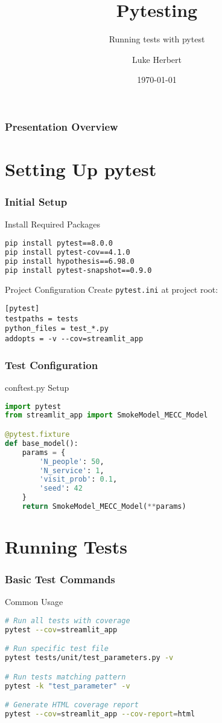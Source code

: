 \documentclass{beamer}
\title{Pytesting}
\subtitle{Running tests with pytest}
\author{Luke Herbert}
\date{\today}
\begin{document}
\frame{\titlepage}

\begin{frame}
    \frametitle{Presentation Overview}
    \tableofcontents
\end{frame}

\section{Setting Up pytest}
\begin{frame}[fragile]
    \frametitle{Initial Setup}
    \begin{block}{Install Required Packages}
        \begin{lstlisting}[language=bash]
pip install pytest==8.0.0
pip install pytest-cov==4.1.0
pip install hypothesis==6.98.0
pip install pytest-snapshot==0.9.0
        \end{lstlisting}
    \end{block}
    
    \begin{alertblock}{Project Configuration}
        Create \texttt{pytest.ini} at project root:
        \begin{lstlisting}[style=configstyle]
[pytest]
testpaths = tests
python_files = test_*.py
addopts = -v --cov=streamlit_app
        \end{lstlisting}
    \end{alertblock}
\end{frame}

\begin{frame}[fragile]
    \frametitle{Test Configuration}
    \begin{block}{conftest.py Setup}
        \begin{lstlisting}[language=Python]
import pytest
from streamlit_app import SmokeModel_MECC_Model

@pytest.fixture
def base_model():
    params = {
        'N_people': 50,
        'N_service': 1,
        'visit_prob': 0.1,
        'seed': 42
    }
    return SmokeModel_MECC_Model(**params)
        \end{lstlisting}
    \end{block}
\end{frame}

\section{Running Tests}
\begin{frame}[fragile]
    \frametitle{Basic Test Commands}
    \begin{exampleblock}{Common Usage}
        \begin{lstlisting}[language=bash]
# Run all tests with coverage
pytest --cov=streamlit_app

# Run specific test file
pytest tests/unit/test_parameters.py -v

# Run tests matching pattern
pytest -k "test_parameter" -v

# Generate HTML coverage report
pytest --cov=streamlit_app --cov-report=html
        \end{lstlisting}
    \end{exampleblock}
\end{frame}
\end{document}
